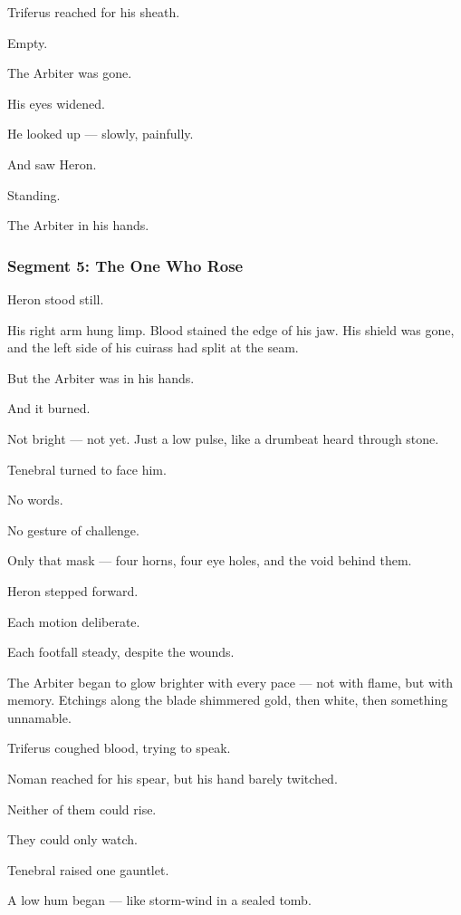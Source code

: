 \documentclass[9pt]{article}
\begin{document}
\bigskip

Triferus reached for his sheath.

Empty.

The Arbiter was gone.

His eyes widened.

He looked up — slowly, painfully.

And saw Heron.

Standing.

The Arbiter in his hands.

\newpage

\subsubsection*{Segment 5: The One Who Rose}

Heron stood still.

His right arm hung limp. Blood stained the edge of his jaw. His shield was gone, and the left side of his cuirass had split at the seam.

But the Arbiter was in his hands.

And it burned.

Not bright — not yet. Just a low pulse, like a drumbeat heard through stone.

\bigskip

Tenebral turned to face him.

No words.

No gesture of challenge.

Only that mask — four horns, four eye holes, and the void behind them.

Heron stepped forward.

Each motion deliberate.

Each footfall steady, despite the wounds.

The Arbiter began to glow brighter with every pace — not with flame, but with memory. Etchings along the blade shimmered gold, then white, then something unnamable.

Triferus coughed blood, trying to speak.

Noman reached for his spear, but his hand barely twitched.

Neither of them could rise.

They could only watch.

\bigskip

Tenebral raised one gauntlet.

A low hum began — like storm-wind in a sealed tomb.
\end{document}
